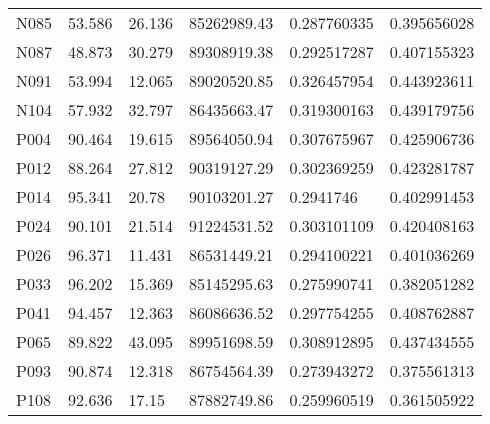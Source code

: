 \begin{table}[!ht]
\begin{tabularx}{\textwidth}{@{}WrZZZr@{}}
N085                    & 53.586           & 26.136           & 85262989.43   & 0.287760335                   & 0.395656028                           \\
N087                    & 48.873           & 30.279           & 89308919.38   & 0.292517287                   & 0.407155323                           \\
N091                    & 53.994           & 12.065           & 89020520.85   & 0.326457954                   & 0.443923611                           \\
N104                    & 57.932           & 32.797           & 86435663.47   & 0.319300163                   & 0.439179756                           \\
P004                    & 90.464           & 19.615           & 89564050.94   & 0.307675967                   & 0.425906736                           \\
P012                    & 88.264           & 27.812           & 90319127.29   & 0.302369259                   & 0.423281787                           \\
P014                    & 95.341           & 20.78            & 90103201.27   & 0.2941746                     & 0.402991453                           \\
P024                    & 90.101           & 21.514           & 91224531.52   & 0.303101109                   & 0.420408163                           \\
P026                    & 96.371           & 11.431           & 86531449.21   & 0.294100221                   & 0.401036269                           \\
P033                    & 96.202           & 15.369           & 85145295.63   & 0.275990741                   & 0.382051282                           \\
P041                    & 94.457           & 12.363           & 86086636.52   & 0.297754255                   & 0.408762887                           \\
P065                    & 89.822           & 43.095           & 89951698.59   & 0.308912895                   & 0.437434555                           \\
P093                    & 90.874           & 12.318           & 86754564.39   & 0.273943272                   & 0.375561313                           \\
P108                    & 92.636           & 17.15            & 87882749.86   & 0.259960519                   & 0.361505922                           \\

\end{tabularx}
\end{table}

